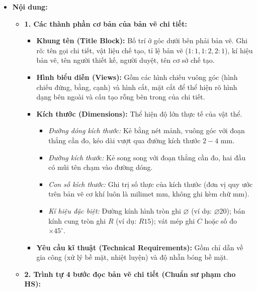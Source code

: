 \documentclass[12pt, a4paper]{article}
\begin{document}
\begin{itemize}[leftmargin=1.2cm]
    \item[b)] \textbf{Nội dung:}
    \begin{itemize}[leftmargin=0.6cm]
        \item \textbf{1. Các thành phần cơ bản của bản vẽ chi tiết:}
        \begin{itemize}
            \item \textbf{Khung tên (Title Block):} Bố trí ở góc dưới bên phải bản vẽ. Ghi rõ: tên gọi chi tiết, vật liệu chế tạo, tỉ lệ bản vẽ ($1:1, 1:2, 2:1$), kí hiệu bản vẽ, tên người thiết kế, người duyệt, tên cơ sở chế tạo.
            \item \textbf{Hình biểu diễn (Views):} Gồm các hình chiếu vuông góc (hình chiếu đứng, bằng, cạnh) và hình cắt, mặt cắt để thể hiện rõ hình dạng bên ngoài và cấu tạo rỗng bên trong của chi tiết.
            \item \textbf{Kích thước (Dimensions):} Thể hiện độ lớn thực tế của vật thể.
            \begin{itemize}
                \item \textit{Đường dóng kích thước:} Kẻ bằng nét mảnh, vuông góc với đoạn thẳng cần đo, kéo dài vượt qua đường kích thước $2 - 4\text{ mm}$.
                \item \textit{Đường kích thước:} Kẻ song song với đoạn thẳng cần đo, hai đầu có mũi tên chạm vào đường dóng.
                \item \textit{Con số kích thước:} Ghi trị số thực của kích thước (đơn vị quy ước trên bản vẽ cơ khí luôn là milimet $\text{mm}$, không ghi kèm chữ $\text{mm}$).
                \item \textit{Kí hiệu đặc biệt:} Đường kính hình tròn ghi $\varnothing$ (ví dụ: $\varnothing 20$); bán kính cung tròn ghi $R$ (ví dụ: $R15$); vát mép ghi $C$ hoặc số đo $\times 45^\circ$.
            \end{itemize}
            \item \textbf{Yêu cầu kĩ thuật (Technical Requirements):} Gồm chỉ dẫn về gia công (xử lý bề mặt, nhiệt luyện) và độ nhẵn bóng bề mặt.
        \end{itemize}

        \item \textbf{2. Trình tự 4 bước đọc bản vẽ chi tiết (Chuẩn sư phạm cho HS):}
    \end{itemize}


\end{itemize}
\end{document}
